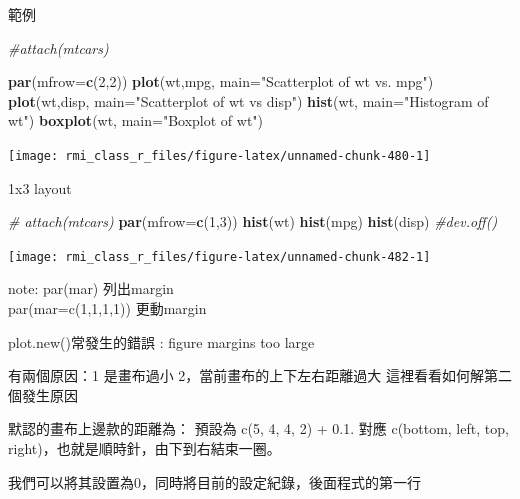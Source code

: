 \documentclass[]{book}
\newenvironment{Shaded}{\begin{snugshade}}{\end{snugshade}}
\newcommand{\CommentTok}[1]{\textcolor[rgb]{0.56,0.35,0.01}{\textit{#1}}}
\newcommand{\DataTypeTok}[1]{\textcolor[rgb]{0.13,0.29,0.53}{#1}}
\newcommand{\DecValTok}[1]{\textcolor[rgb]{0.00,0.00,0.81}{#1}}
\newcommand{\KeywordTok}[1]{\textcolor[rgb]{0.13,0.29,0.53}{\textbf{#1}}}
\newcommand{\NormalTok}[1]{#1}
\newcommand{\StringTok}[1]{\textcolor[rgb]{0.31,0.60,0.02}{#1}}
\theoremstyle{definition}
\theoremstyle{definition}
\theoremstyle{definition}
\theoremstyle{remark}
\begin{document}
範例

\begin{Shaded}
\begin{Highlighting}[]
\CommentTok{#attach(mtcars)}

\KeywordTok{par}\NormalTok{(}\DataTypeTok{mfrow=}\KeywordTok{c}\NormalTok{(}\DecValTok{2}\NormalTok{,}\DecValTok{2}\NormalTok{))}
\KeywordTok{plot}\NormalTok{(wt,mpg, }\DataTypeTok{main=}\StringTok{"Scatterplot of wt vs. mpg"}\NormalTok{)}
\KeywordTok{plot}\NormalTok{(wt,disp, }\DataTypeTok{main=}\StringTok{"Scatterplot of wt vs disp"}\NormalTok{)}
\KeywordTok{hist}\NormalTok{(wt, }\DataTypeTok{main=}\StringTok{"Histogram of wt"}\NormalTok{)}
\KeywordTok{boxplot}\NormalTok{(wt, }\DataTypeTok{main=}\StringTok{"Boxplot of wt"}\NormalTok{)}
\end{Highlighting}
\end{Shaded}

\begin{center}\texttt{[image: rmi\_class\_r\_files/figure-latex/unnamed-chunk-480-1]} \end{center}

1x3 layout

\begin{Shaded}
\begin{Highlighting}[]
\CommentTok{# attach(mtcars)}
\KeywordTok{par}\NormalTok{(}\DataTypeTok{mfrow=}\KeywordTok{c}\NormalTok{(}\DecValTok{1}\NormalTok{,}\DecValTok{3}\NormalTok{)) }
\KeywordTok{hist}\NormalTok{(wt)}
\KeywordTok{hist}\NormalTok{(mpg)}
\KeywordTok{hist}\NormalTok{(disp)}
\CommentTok{#dev.off()}
\end{Highlighting}
\end{Shaded}

\begin{center}\texttt{[image: rmi\_class\_r\_files/figure-latex/unnamed-chunk-482-1]} \end{center}

note: par(mar) 列出margin\\
par(mar=c(1,1,1,1)) 更動margin

plot.new()常發生的錯誤 : figure margins too large

有兩個原因：1 是畫布過小 2，當前畫布的上下左右距離過大
這裡看看如何解第二個發生原因

默認的畫布上邊款的距離為： 預設為 c(5, 4, 4, 2) + 0.1. 對應 c(bottom,
left, top, right)，也就是順時針，由下到右結束一圈。

我們可以將其設置為0，同時將目前的設定紀錄，後面程式的第一行
\end{document}
